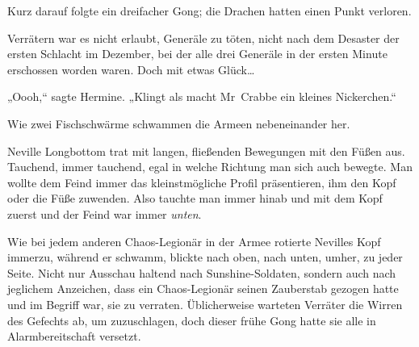 Kurz darauf folgte ein dreifacher Gong; die Drachen hatten einen Punkt verloren.

Verrätern war es nicht erlaubt, Generäle zu töten, nicht nach dem Desaster der ersten Schlacht im Dezember, bei der alle drei Generäle in der ersten Minute erschossen worden waren. Doch mit etwas Glück…

„Oooh,“ sagte Hermine. „Klingt als macht Mr~Crabbe ein kleines Nickerchen.“

\later

Wie zwei Fischschwärme schwammen die Armeen nebeneinander her.

Neville Longbottom trat mit langen, fließenden Bewegungen mit den Füßen aus. Tauchend, immer tauchend, egal in welche Richtung man sich auch bewegte. Man wollte dem Feind immer das kleinstmögliche Profil präsentieren, ihm den Kopf oder die Füße zuwenden. Also tauchte man immer hinab und mit dem Kopf zuerst und der Feind war immer \emph{unten}.

Wie bei jedem anderen Chaos-Legionär in der Armee rotierte Nevilles Kopf immerzu, während er schwamm, blickte nach oben, nach unten, umher, zu jeder Seite. Nicht nur Ausschau haltend nach Sunshine-Soldaten, sondern auch nach jeglichem Anzeichen, dass ein Chaos-Legionär seinen Zauberstab gezogen hatte und im Begriff war, sie zu verraten. Üblicherweise warteten Verräter die Wirren des Gefechts ab, um zuzuschlagen, doch dieser frühe Gong hatte sie alle in Alarmbereitschaft versetzt.

